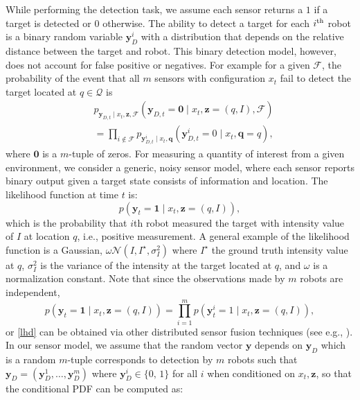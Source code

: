 \documentclass[letterpaper, 10 pt, conference]{ieeeconf}
\begin{document}
While performing the detection task, we assume each sensor returns a $1$ if a target is detected or $0$ otherwise. 
The ability to detect a target for each $i^{\textup{th}}$ robot is a binary random variable $\bm{y}_D^i$ with a distribution that depends on the relative distance between the target and robot. 
This binary detection model, however, does not account for false positive or negatives.
For example for a given $\mathcal{F}$, the probability of the event that all $m$ sensors with configuration $x_t$ fail to detect the target located at $q \in \mathcal{Q}$ is
\begin{align}
&p_{\bm{y}_{D,t} \mid
	{x}_{t},\bm{z},\mathcal{F}}\left(
\bm{y}_{D,t} = \bm{0} \mid {x}_{t},
\bm{z}=(q,I),\mathcal{F}\right) \nonumber \\
&= \prod_{i \notin \mathcal{F}}
p_{\bm{y}_{D,t}^i \mid
	{x}_{t},\bm{q}}\left(
\bm{y}_{D,t}^i = 0 \mid
{x}_{t},\bm{q}=q\right), \nonumber
\end{align}
where $\bm{0}$ is a $m$-tuple of zeros. For measuring a quantity of interest from a given environment, we consider a generic, noisy sensor model, where each sensor reports
binary output given a target state consists of information and location.
The likelihood function at time $t$ is:
\begin{equation}
p(\bm{y}_t = \bm{1} \mid x_t, \bm{z} = (q,I)),
\label{lhd}
\end{equation}
which is the probability that $i$th robot measured the target 
with intensity value of $I$ at location $q$, i.e., positive measurement.
A general example of the likelihood function is a Gaussian, $\omega\mathcal{N}(I,I^{\star},\sigma_I^2)$ where $I^{\star}$ the ground truth intensity value at $q$, $\sigma_I^2$ is the variance of the intensity at the target located at $q$, and $\omega$ is a normalization constant. Note that since the observations made by $m$ robots are independent,
\[
p(\bm{y}_t = \bm{1} \mid x_t, \bm{z} = (q,I)) =
\prod_{i=1}^m
p(\bm{y}_t^i = 1 \mid x_t, \bm{z} = (q,I)),
\] 
or \eqref{lhd} can be obtained via other distributed sensor fusion techniques (see e.g., \cite{stroupe2001distributed}).
In our sensor model, we assume that the random vector $\bm{y}$ depends on $\bm{y}_D$ which is a random $m$-tuple corresponds to detection by $m$ robots such that $\bm{y}_D = (\bm{y}_D^1,\dots,\bm{y}_D^m)$ where $\bm{y}_D^i \in \lbrace 0,\,1 \rbrace$ for all $i$ when conditioned on $x_t,\bm{z}$, so that the conditional PDF can be computed as:
\end{document}
